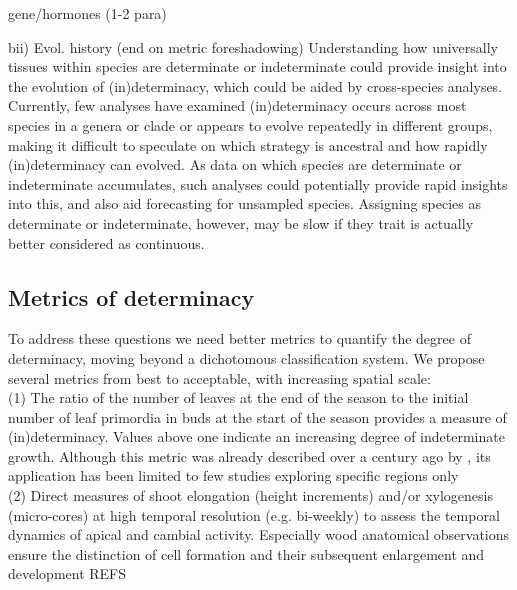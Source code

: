 \documentclass{article}
\begin{document}
	

	gene/hormones (1-2 para) %
	
	bii) Evol. history (end on metric foreshadowing) %
	Understanding how universally tissues within species are determinate or indeterminate could provide insight into the evolution of (in)determinacy, which could be aided by cross-species analyses. Currently, few analyses have examined (in)determinacy occurs across most species in a genera or clade or appears to evolve repeatedly in different groups, making it difficult to speculate on which strategy is ancestral and how rapidly (in)determinacy can evolved. As data on which species are determinate or indeterminate accumulates, such analyses could potentially provide rapid insights into this, and also aid forecasting for unsampled species. Assigning species as determinate or indeterminate, however, may be slow if they trait is actually better considered as continuous. %
	
	\subsection*{Metrics of determinacy}
	To address these questions we need better metrics to quantify the degree of determinacy, moving beyond a dichotomous classification system. We propose several metrics from best to acceptable, with increasing spatial scale: \\
	
	(1) The ratio of the number of leaves at the end of the season to the initial number of leaf primordia in buds at the start of the season provides a measure of (in)determinacy. Values above one indicate an increasing degree of indeterminate growth. Although this metric was already described over a century ago by \citet{mooreStudyWinterBuds1909}, its application has been limited to few studies exploring specific regions only \citep{damascosBudCompositionBranching2005, kikuzawaLeafSurvivalWoody1983} \\
	
	(2) Direct measures of shoot elongation (height increments) and/or xylogenesis (micro-cores) at high temporal resolution (e.g. bi-weekly) to assess the temporal dynamics of apical and cambial activity. Especially wood anatomical observations ensure the distinction of cell formation and their subsequent enlargement and development REFS\\
	
\end{document}

